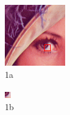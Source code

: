 \documentclass[pdftex,12pt,a4paper]{report}
\begin{document}
\begin{figure}[H]
\begin{subfigure}{.5\textwidth}
  \centering
  \includegraphics[width=.8\linewidth]{images/lenna_marked_small}
  \caption{1a}
  \label{fig:lennas1}
\end{subfigure}%
\begin{subfigure}{.5\textwidth}
  \centering
  \includegraphics[width=.8\linewidth]{images/lenna_small}
  \caption{1b}
  \label{fig:lennas2}
\end{subfigure}
\centering
\begin{subfigure}{.5\textwidth}

\end{subfigure}
\end{figure}
\end{document}
